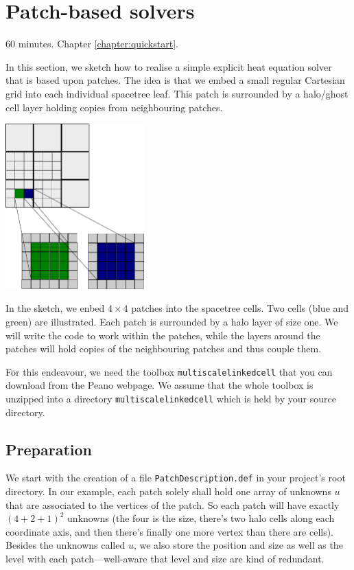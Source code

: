 \section{Patch-based solvers}


\chapterDescription
  {
    60 minutes.
  }
  {
    Chapter \ref{chapter:quickstart}.
  }

In this section, we sketch how to realise a simple explicit heat equation
solver that is based upon patches.
The idea is that we embed a small regular Cartesian grid into each individual
spacetree leaf.
This patch is surrounded by a halo/ghost cell layer holding copies from
neighbouring patches.

\begin{center}
  \includegraphics[width=0.4\textwidth]{22_patch-based-solver/patches.pdf}
\end{center}

In the sketch, we enbed $4\times 4$ patches into the spacetree cells.
Two cells (blue and green) are illustrated.
Each patch is surrounded by a halo layer of size one.
We will write the code to work within the patches, while the layers around the
patches will hold copies of the neighbouring patches and thus couple them.

For this endeavour, we need the toolbox \texttt{multiscalelinkedcell} that you
can download from the Peano webpage.
We assume that the whole toolbox is unzipped into a directory
\texttt{multiscalelinkedcell} which is held by your source directory.


\subsection{Preparation}

We start with the creation of a file \texttt{PatchDescription.def} in your
project's root directory. 
In our example, each patch solely shall hold one array of unknowns $u$ that are
associated to the vertices of the patch.
So each patch will have exactly $(4+2+1)^2$ unknowns (the four is the size,
there's two halo cells along each coordinate axis, and then there's finally one
more vertex than there are cells).
Besides the unknowns called $u$, we also store the position and size as well as
the level with each patch---well-aware that level and size are kind of
redundant.

